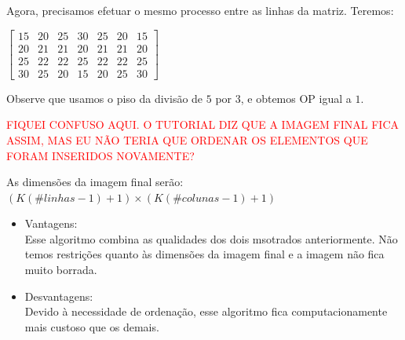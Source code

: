 \documentclass[a4paper, 12pt]{article}
\begin{document}
Agora, precisamos efetuar o mesmo processo entre as linhas da matriz. Teremos:
\begin{table}[!htbp]
	\centering
	$
	\begin{bmatrix}
		15 & 20 & 25 & 30 & 25 & 20 & 15 \\
		20 & 21 & 21 & 20 & 21 & 21 & 20 \\
		25 & 22 & 22 & 25 & 22 & 22 & 25 \\
		30 & 25 & 20 & 15 & 20 & 25 & 30
	\end{bmatrix}
	$
\end{table}
Observe que usamos o piso da divisão de $5$ por $3$, e obtemos OP igual a $1$.

\large{\textcolor{red}{FIQUEI CONFUSO AQUI. O TUTORIAL DIZ QUE A IMAGEM FINAL FICA ASSIM, MAS EU NÃO TERIA QUE ORDENAR OS ELEMENTOS 
QUE FORAM INSERIDOS NOVAMENTE?}}

As dimensões da imagem final serão: $(K(\#linhas - 1) + 1) \times (K(\#colunas - 1) + 1)$

\begin{itemize}
	\item Vantagens:
 	\\
	Esse algoritmo combina as qualidades dos dois msotrados anteriormente. Não temos restrições quanto às dimensões da imagem final 
	e a imagem não fica muito borrada.
	\item Desvantagens:
 	\\
	Devido à necessidade de ordenação, esse algoritmo fica computacionamente mais custoso que os demais.
\end{itemize}
\end{document}
